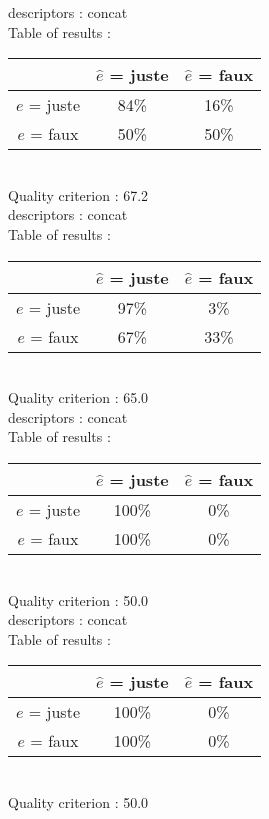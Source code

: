 descriptors : concat \\
Table of results : \\
\begin{tabular}{|c|c|c|}
\hline				& $\hat{e}$ = juste & $\hat{e}$ = faux \\
\hline  $e$ = juste	&     84\%			&     16\%		\\
\hline  $e$ = faux	&     50\%			&     50\%		\\
\hline
\end{tabular}\\
Quality criterion :   67.2 \\

descriptors : concat \\
Table of results : \\
\begin{tabular}{|c|c|c|}
\hline				& $\hat{e}$ = juste & $\hat{e}$ = faux \\
\hline  $e$ = juste	&     97\%			&      3\%		\\
\hline  $e$ = faux	&     67\%			&     33\%		\\
\hline
\end{tabular}\\
Quality criterion :   65.0 \\

descriptors : concat \\
Table of results : \\
\begin{tabular}{|c|c|c|}
\hline				& $\hat{e}$ = juste & $\hat{e}$ = faux \\
\hline  $e$ = juste	&    100\%			&      0\%		\\
\hline  $e$ = faux	&    100\%			&      0\%		\\
\hline
\end{tabular}\\
Quality criterion :   50.0 \\

descriptors : concat \\
Table of results : \\
\begin{tabular}{|c|c|c|}
\hline				& $\hat{e}$ = juste & $\hat{e}$ = faux \\
\hline  $e$ = juste	&    100\%			&      0\%		\\
\hline  $e$ = faux	&    100\%			&      0\%		\\
\hline
\end{tabular}\\
Quality criterion :   50.0 \\

